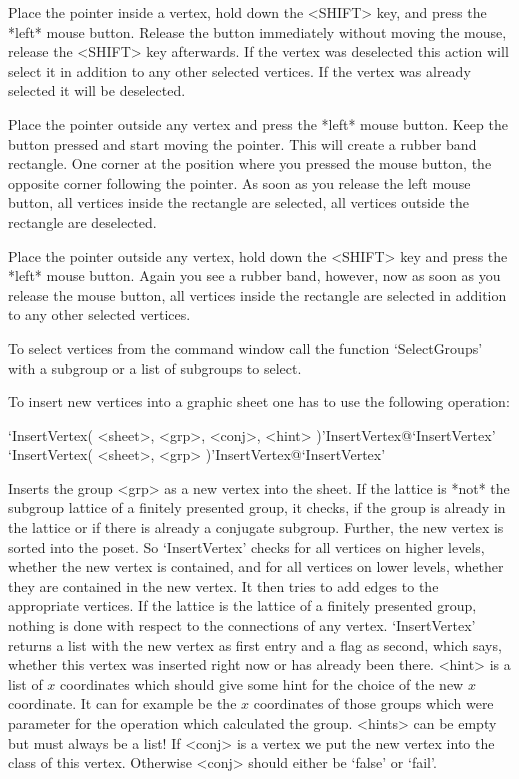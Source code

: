 Place the  pointer inside a vertex, hold  down the <SHIFT> key, and press
the  *left* mouse button.   Release the button immediately without moving
the    mouse, release the   <SHIFT> key  afterwards.   If  the vertex was
deselected this action will  select it in  addition to any other selected
vertices. If the vertex was already selected it will be deselected.

Place the pointer  outside any vertex  and press the *left* mouse button.
Keep the button pressed and start moving the pointer.  This will create a
rubber band rectangle.  One corner at the position  where you pressed the
mouse button, the opposite corner following  the pointer.  As soon as you
release the left mouse button,   all  vertices inside the rectangle   are
selected, all vertices outside the rectangle are deselected.

Place the pointer outside any vertex, hold down the <SHIFT> key and press
the *left*  mouse button.  Again  you see a rubber  band, however, now as
soon as you release  the mouse button,  all vertices inside the rectangle
are selected in addition to any other selected vertices.

To select vertices from the {\GAP} command window call the function
`SelectGroups' with a subgroup or a list of subgroups to select.



To insert new vertices into a graphic sheet one has to use the
following operation:

\>`InsertVertex( <sheet>, <grp>, <conj>, <hint> )'{InsertVertex}@{`InsertVertex'} 
\>`InsertVertex( <sheet>, <grp> )'{InsertVertex}@{`InsertVertex'} 

Inserts the group <grp> as a new vertex into the sheet. If the lattice
is *not*  the   subgroup lattice  of a  finitely  presented  group, it
checks, if the group is already in the lattice  or if there is already
a conjugate  subgroup.  Further,  the new  vertex is  sorted into  the
poset. So  `InsertVertex'  checks for  all vertices  on higher levels,
whether the new vertex  is contained,  and  for all vertices on  lower
levels, whether they are contained in the new vertex. It then tries to
add edges to the appropriate vertices.  If  the lattice is the lattice
of a  finitely presented group,  nothing is  done with respect  to the
connections of any vertex.  `InsertVertex' returns a list with the new
vertex as first entry and  a flag as  second, which says, whether this
vertex was inserted right now or has already  been there.  <hint> is a
list of $x$ coordinates which should give  some hint for the choice of
the new $x$  coordinate. It can for example  be the $x$ coordinates of
those groups which  were parameter for  the operation which calculated
the group. <hints> can be empty but must always be  a list!  If <conj>
is a vertex we  put  the new vertex  into the  class  of this vertex.  
Otherwise <conj> should either be `false' or `fail'.


